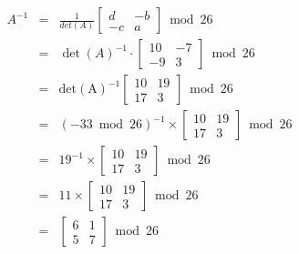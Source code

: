 \documentclass{article}
\begin{document}
\begin{eqnarray}   
\label{eq}
A^{-1}&=&\frac{1}{det(A)}\left[\begin{array}{cc}
d & -b \\
-c & a
\end{array}\right] \bmod 26 \nonumber \\ 
&=& \operatorname{det}(A)^{-1} \cdot\left[\begin{array}{cc}
10 & -7 \\
-9 & 3
\end{array}\right] \bmod 26 \nonumber \\ 
&=&\operatorname{det(A)}^{-1}\left[\begin{array}{cc}
10 & 19 \\
17 & 3
\end{array}\right]  \bmod 26 \nonumber \\ 
&=& (-33\bmod 26)^{-1} \times \left[\begin{array}{cc}
10 & 19 \\
17 & 3
\end{array}\right]  \bmod 26 \nonumber \\ 
&=& 19^{-1} \times \left[\begin{array}{cc}
10 & 19 \\
17 & 3
\end{array}\right]  \bmod 26 \nonumber \\ 
&=& 11 \times \left[\begin{array}{cc}
10 & 19 \\
17 & 3
\end{array}\right]  \bmod 26 \nonumber \\ 
&=&\left[\begin{array}{cc}
6 & 1 \\
5 & 7
\end{array}\right]  \bmod 26 \nonumber \\ 
\nonumber 
\end{eqnarray}
\end{document}
